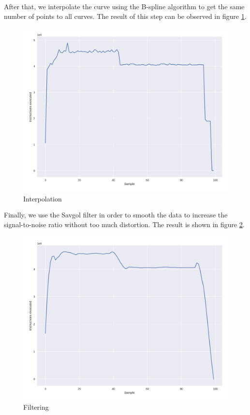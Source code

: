  After that, we interpolate the curve using the B-spline \cite{Hang2017CubicApplications} algorithm to get the same number of points to all curves. 
 The result of this step can be observed in figure \ref{fig:interporlation}. 

\begin{figure}[H]
    \centering
    \includegraphics[width=\textwidth]{fingerprint/figures/workflow_2.png}
    \caption{Interpolation}
    \label{fig:interporlation}
\end{figure}

Finally, we use the Savgol filter \cite{Luo2005PropertiesDifferentiators} in order to smooth the data to increase the signal-to-noise ratio without too much distortion. The result is shown in figure \ref{fig:filtering}.

\begin{figure}[H]
    \centering
    \includegraphics[width=\textwidth]{fingerprint/figures/workflow_3.png}
    \caption{Filtering}
    \label{fig:filtering}
\end{figure}

